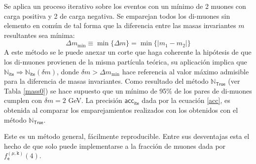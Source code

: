 Se aplica un proceso iterativo sobre los eventos con un mínimo de 2 muones con carga positiva y 2 de carga negativa. Se emparejan todos los di-muones sin elemento en común de tal forma que la diferencia entre las masas invariantes $m$ resultantes sea mínima:
\begin{equation}
\Delta m_{\min} \equiv \min{\{\Delta m\}}  = \min{\{|m_1-m_2|\}}
\end{equation}
A este método se le puede anexar un corte que haga coherente la hipótesis de que los di-muones provienen de la misma partícula teórica, su aplicación implica que $\mathbb{N}_\textsf{ite} \Rightarrow \mathbb{N}_\textsf{ite}(\delta m)$, donde $\delta m > \Delta m_{\min}$ hace referencia al valor máximo admisible para la diferencia de masas invariantes. Como resultado del método $\mathbb{N}_\textsf{True}$ (ver Tabla \ref{mass0}) se hace supuesto que un mínimo de 95\% de los pares de di-muones cumplen con $\delta m = 2$ GeV. La precisión $\textsf{acc}_\textsf{ite}$ dada por la ecuación \ref{acc}, es obtenida al comparar los emparejamientos realizados con los obtenidos con el método $\mathbb{N}_\textsf{True}$.

Este es un método general, fácilmente reproducible. %
Entre sus desventajas esta el hecho de que solo puede implementarse  a la fracción de muones dada por $f^{(\mu, \texttt{k})}_\textsf{e} (4)$.


